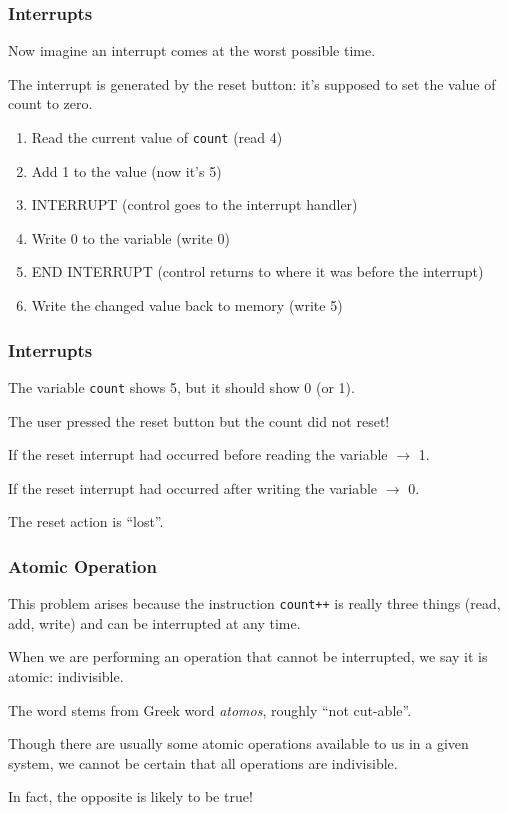 \begin{frame}
	\frametitle{Interrupts}

	Now imagine an interrupt comes at the worst possible time.

	The interrupt is generated by the reset button: it's supposed to set the value of count to zero.

	\begin{enumerate}
		\item Read the current value of \texttt{count} (read 4)
		\item Add 1 to the value (now it's 5)
		\item INTERRUPT (control goes to the interrupt handler)
		\item Write 0 to the variable (write 0)
		\item END INTERRUPT (control returns to where it was before the interrupt)
		\item Write the changed value back to memory (write 5)
	\end{enumerate}

\end{frame}

\begin{frame}
	\frametitle{Interrupts}

	The variable \texttt{count} shows 5, but it should show 0 (or 1).

	The user pressed the reset button but the count did not reset!

	If the reset interrupt had occurred before reading the variable $\rightarrow$ 1.

	If the reset interrupt had occurred after writing the variable $\rightarrow$ 0.

	The reset action is ``lost''.

\end{frame}

\begin{frame}
	\frametitle{Atomic Operation}

	This problem arises because the instruction \texttt{count++} is really three things (read, add, write) and can be interrupted at any time.

	When we are performing an operation that cannot be interrupted, we say it is \alert{atomic}: indivisible.

	The word stems from Greek word \textit{atomos}, roughly ``not cut-able''.

	Though there are usually some atomic operations available to us in a given system, we cannot be certain that all operations are indivisible.

	In fact, the opposite is likely to be true!

\end{frame}

